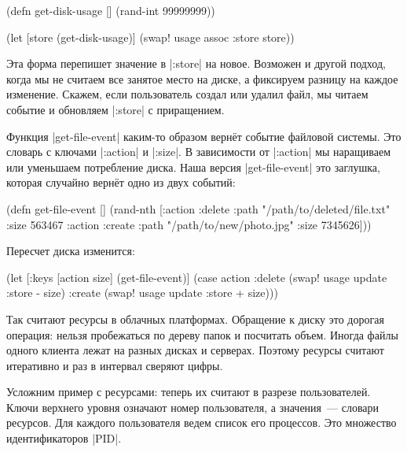 \begin{english}
  \begin{clojure}
(defn get-disk-usage []
  (rand-int 99999999))

(let [store (get-disk-usage)]
  (swap! usage assoc :store store))
  \end{clojure}
\end{english}

Эта форма перепишет значение в \spverb|:store| на новое. Возможен и другой
подход, когда мы не считаем все занятое место на диске, а фиксируем разницу на
каждое изменение. Скажем, если пользователь создал или удалил файл, мы читаем
событие и обновляем \spverb|:store| с приращением.

Функция \spverb|get-file-event| каким-то образом верн\"{е}т событие файловой
системы. Это словарь с ключами \spverb|:action| и \spverb|:size|. В зависимости
от \spverb|:action| мы наращиваем или уменьшаем потребление диска. Наша версия
\spverb|get-file-event| это заглушка, которая случайно верн\"{е}т одно из двух
событий:

\begin{english}
  \begin{clojure}
(defn get-file-event []
  (rand-nth
   [{:action :delete
     :path "/path/to/deleted/file.txt"
     :size 563467}
    {:action :create
     :path "/path/to/new/photo.jpg"
     :size 7345626}]))
  \end{clojure}
\end{english}

\noindent
Пересчет диска изменится:

\begin{english}
  \begin{clojure}
(let [{:keys [action size]} (get-file-event)]
  (case action
    :delete
    (swap! usage update :store - size)
    :create
    (swap! usage update :store + size)))
  \end{clojure}
\end{english}

Так считают ресурсы в облачных платформах. Обращение к диску это дорогая
операция: нельзя пробежаться по дереву папок и посчитать объем. Иногда файлы
одного клиента лежат на разных дисках и серверах. Поэтому ресурсы считают
итеративно и раз в интервал сверяют цифры.

Усложним пример с ресурсами: теперь их считают в разрезе пользователей. Ключи
верхнего уровня означают номер пользователя, а значения~--- словари
ресурсов. Для каждого пользователя ведем список его процессов. Это множество
идентификаторов \spverb|PID|.

